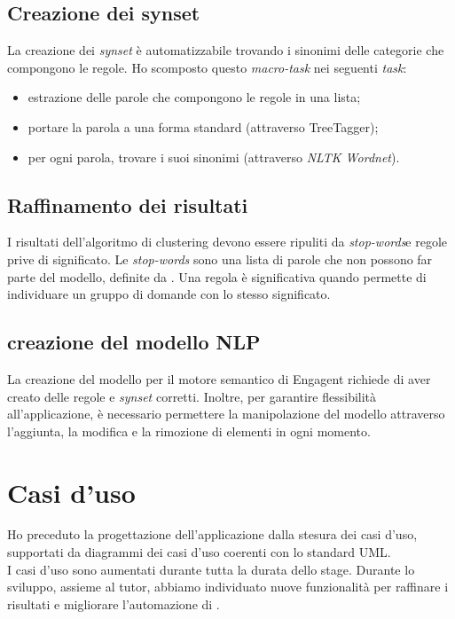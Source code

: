 \subsection*{Creazione dei synset}
La creazione dei \emph{synset} è automatizzabile trovando i sinonimi delle categorie che compongono le regole. Ho scomposto questo \textit{macro-task} nei seguenti \textit{task}:
\begin{itemize}
    \item estrazione delle parole che compongono le regole in una lista;
    \item portare la parola a una forma standard (attraverso TreeTagger);
    \item per ogni parola, trovare i suoi sinonimi (attraverso \textit{NLTK Wordnet}).
\end{itemize}

\subsection*{Raffinamento dei risultati}
I risultati dell'algoritmo di clustering devono essere ripuliti da \emph{stop-words}\glsfirstoccur e regole prive di significato.
Le \textit{stop-words} sono una lista di parole che non possono far parte del modello, definite da \company{}.
Una regola è significativa quando permette di individuare un gruppo di domande con lo stesso significato. 

\subsection*{creazione del modello NLP}
La creazione del modello per il motore semantico di Engagent richiede di aver creato delle regole e \emph{synset} corretti. Inoltre, per garantire flessibilità all'applicazione, è necessario permettere la manipolazione del modello attraverso l'aggiunta, la modifica e la rimozione di elementi in ogni momento.



\section{Casi d'uso}
Ho preceduto la progettazione dell'applicazione dalla stesura dei casi d'uso, supportati da diagrammi dei casi d'uso coerenti con lo standard UML.\\
I casi d'uso sono aumentati durante tutta la durata dello stage. Durante lo sviluppo, assieme al tutor, abbiamo individuato nuove funzionalità per raffinare i risultati e migliorare l'automazione di \app{}.

